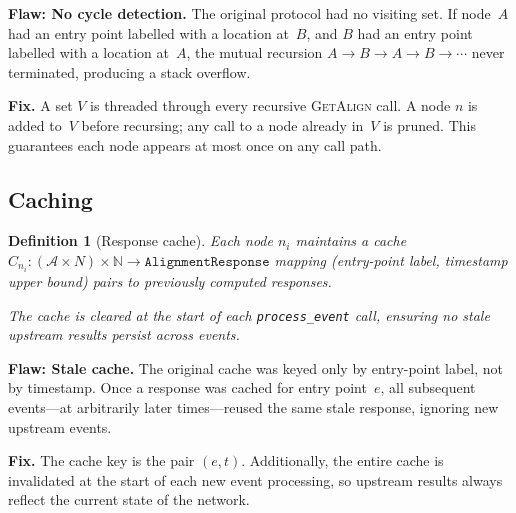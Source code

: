 \documentclass[11pt,a4paper]{article}
\newcommand{\new}[1]{{\color{Blue}#1}}         %
\newtheorem{definition}{Definition}
\newcommand{\A}{\mathcal{A}}
\newcommand{\Nodes}{N}
\newcommand{\GA}{\textsc{GetAlign}}
\begin{document}
\begin{oldbox}
\textbf{Flaw: No cycle detection.}\;
The original protocol had no visiting set.  If node~$A$ had an entry
point labelled with a location at~$B$, and $B$ had an entry point
labelled with a location at~$A$, the mutual recursion
$A \to B \to A \to B \to \cdots$ never terminated, producing a stack
overflow.
\end{oldbox}

\begin{newboxelem}
\textbf{Fix.}\;
A set $V$ is threaded through every recursive \GA{} call.
A node $n$ is added to~$V$ before recursing; any call to a node
already in~$V$ is pruned.  This guarantees each node appears at most
once on any call path.
\end{newboxelem}

\subsection{Caching}

\begin{definition}[Response cache]\label{def:cache}
  Each node $n_i$ maintains a cache
  $C_{n_i}\colon (\A \times \Nodes) \times \mathbb{N}
    \to \texttt{AlignmentResponse}$
  mapping (entry-point label, timestamp upper bound) pairs to previously
  computed responses.

  \new{The cache is cleared at the start of each \texttt{process\_event}
  call}, ensuring no stale upstream results persist across events.
\end{definition}

\begin{oldbox}
\textbf{Flaw: Stale cache.}\;
The original cache was keyed only by entry-point label, not by
timestamp.  Once a response was cached for entry point~$e$, all
subsequent events—at arbitrarily later times—reused the same stale
response, ignoring new upstream events.
\end{oldbox}

\begin{newboxelem}
\textbf{Fix.}\;
The cache key is the pair $(e, t)$.  Additionally, the entire cache
is invalidated at the start of each new event processing, so upstream
results always reflect the current state of the network.
\end{newboxelem}

\end{document}
